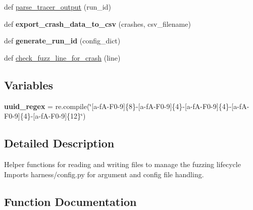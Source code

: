 \begin{DoxyCompactItemize}
def \mbox{\hyperlink{namespaceharness_1_1state_a2c5e55fbbbe7646470ac7d81d92e568a}{parse\+\_\+tracer\+\_\+output}} (run\+\_\+id)
\item 
\mbox{\label{namespaceharness_1_1state_aa6981fa27cef047ec5f31c7d8d9ad9f7}} 
def {\bfseries export\+\_\+crash\+\_\+data\+\_\+to\+\_\+csv} (crashes, csv\+\_\+filename)
\item 
\mbox{\label{namespaceharness_1_1state_a43b170ad2ad253789f55cf6b48b219f0}} 
def {\bfseries generate\+\_\+run\+\_\+id} (config\+\_\+dict)
\item 
def \mbox{\hyperlink{namespaceharness_1_1state_a8a2197641df9c66f1a6992cfa340e70a}{check\+\_\+fuzz\+\_\+line\+\_\+for\+\_\+crash}} (line)
\end{DoxyCompactItemize}
\subsection*{Variables}
\begin{DoxyCompactItemize}
\item 
\mbox{\label{namespaceharness_1_1state_a5b8a25a1e9d175f56cdb7b4cc14840f5}} 
{\bfseries uuid\+\_\+regex} = re.\+compile(\char`\"{}\mbox{[}a-\/fA-\/F0-\/9\mbox{]}\{8\}-\/\mbox{[}a-\/fA-\/F0-\/9\mbox{]}\{4\}-\/\mbox{[}a-\/fA-\/F0-\/9\mbox{]}\{4\}-\/\mbox{[}a-\/fA-\/F0-\/9\mbox{]}\{4\}-\/\mbox{[}a-\/fA-\/F0-\/9\mbox{]}\{12\}\char`\"{})
\end{DoxyCompactItemize}


\subsection{Detailed Description}
\begin{DoxyVerb}Helper functions for reading and writing files to manage the fuzzing lifecycle
Imports harness/config.py for argument and config file handling.
\end{DoxyVerb}
 

\subsection{Function Documentation}
\mbox{\label{namespaceharness_1_1state_a8a2197641df9c66f1a6992cfa340e70a}} 
